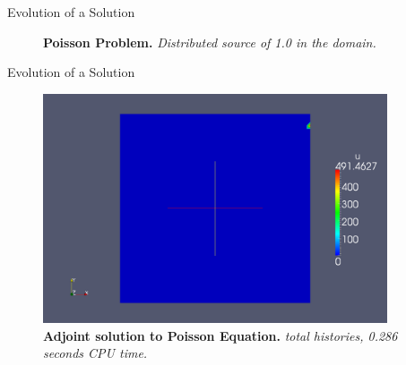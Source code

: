 \documentclass{beamer}
\begin{document}
\begin{frame}{Evolution of a Solution}

  \begin{figure}[htpb!]
    \begin{center}
      \scalebox{1.0}{  }
    \end{center}
    \caption{\textbf{Poisson Problem.}
      \textit{Distributed source of 1.0 in the domain.}}
  \end{figure}

\end{frame}

\begin{frame}{Evolution of a Solution}

  \begin{figure}[h!]
    \begin{center}
      \includegraphics[width=4in]{adjoint_1.png}
    \end{center}
    \caption{\textbf{Adjoint solution to Poisson Equation.}
      \textit{ total histories, 0.286 seconds CPU time.} }
  \end{figure}

\end{frame}
\end{document}
